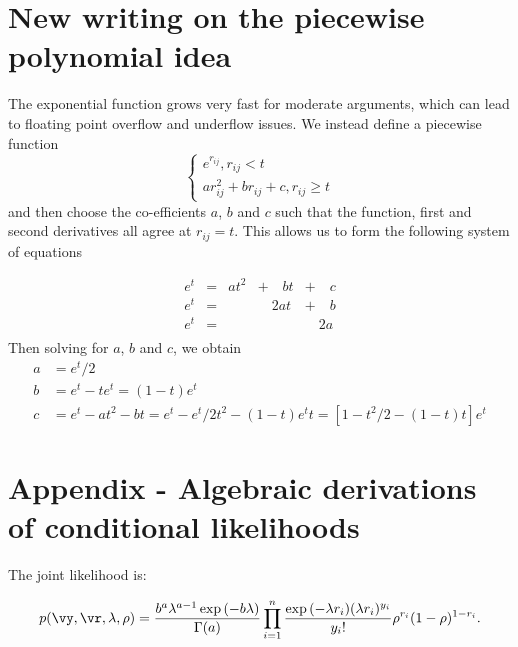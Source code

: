 \section{New writing on the piecewise polynomial idea}
The exponential function grows very fast for moderate arguments, which can lead to floating point overflow
and underflow issues. We instead define a piecewise function
\[
	\begin{cases}
		e^{r_{ij}}, r_{ij} < t \\
		a r_{ij}^2 + b r_{ij} + c, r_{ij} \geq t
	\end{cases}
\]
and then choose the co-efficients $a$, $b$ and $c$ such that the function, first and second derivatives all
agree at $r_{ij} = t$. This allows us to form the following system of equations

\[
	\begin{array}{lllll}
		e^t &= &a t^2 &+ \quad b t &+ \quad c \\
		e^t &= &&\quad 2a t &+ \quad b \\
		e^t &= &&&\quad 2a \\
	\end{array}
\]
Then solving for $a$, $b$ and $c$, we obtain
\begin{align*}
	a &= e^t / 2 \\
	b &= e^t - t e^t = (1 - t) e^t \\
	c &= e^t - at^2 - bt = e^t - e^t/2 t^2 - (1 - t) e^t t = [1 - t^2/2 - (1 - t) t] e^t
\end{align*}

\section{Appendix - Algebraic derivations of conditional likelihoods}

The joint likelihood is:

$$
p(\vy, \vr, \lambda, \rho) = \frac{b^a \lambda^{a - 1} \exp{(-b \lambda)}}{\Gamma{(a)}} \prod_{i=1}^n \frac{\exp{(-\lambda r_i)} (\lambda r_i)^{y_i}}{y_i !} \rho^{r_i} (1 - \rho)^{1 - r_i}.
$$

